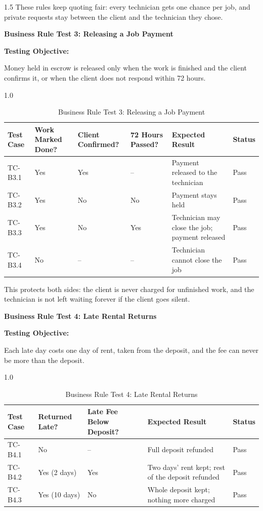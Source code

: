 \documentclass[A4paper,12pt]{report}
\theoremstyle{plain}
\theoremstyle{definition}
\theoremstyle{remark}
\numberwithin{equation}{section}
\begin{document}
\begin{spacing}{1.5}
These rules keep quoting fair: every technician gets one chance per job, and private requests stay between the client and the technician they chose.

\textbf{Business Rule Test 3: Releasing a Job Payment}

\textbf{Testing Objective:}

Money held in escrow is released only when the work is finished and the client confirms it, or when the client does not respond within 72 hours.

\begin{table}[H]
\centering
\caption{Business Rule Test 3: Releasing a Job Payment}
\begin{spacing}{1.0}
{\small
\begin{tabular}{|p{}|p{}|p{}|p{}|p{}|p{}|}
\hline
\textbf{Test Case} & \textbf{Work Marked Done?} & \textbf{Client Confirmed?} & \textbf{72 Hours Passed?} & \textbf{Expected Result} & \textbf{Status} \\ \hline
TC-B3.1 & Yes & Yes & -- & Payment released to the technician & Pass \\ \hline
TC-B3.2 & Yes & No & No & Payment stays held & Pass \\ \hline
TC-B3.3 & Yes & No & Yes & Technician may close the job; payment released & Pass \\ \hline
TC-B3.4 & No & -- & -- & Technician cannot close the job & Pass \\ \hline
\end{tabular}}
\end{spacing}
\end{table}

This protects both sides: the client is never charged for unfinished work, and the technician is not left waiting forever if the client goes silent.

\textbf{Business Rule Test 4: Late Rental Returns}

\textbf{Testing Objective:}

Each late day costs one day of rent, taken from the deposit, and the fee can never be more than the deposit.

\begin{table}[H]
\centering
\caption{Business Rule Test 4: Late Rental Returns}
\begin{spacing}{1.0}
{\small
\begin{tabular}{|p{}|p{}|p{}|p{}|p{}|}
\hline
\textbf{Test Case} & \textbf{Returned Late?} & \textbf{Late Fee Below Deposit?} & \textbf{Expected Result} & \textbf{Status} \\ \hline
TC-B4.1 & No & -- & Full deposit refunded & Pass \\ \hline
TC-B4.2 & Yes (2 days) & Yes & Two days' rent kept; rest of the deposit refunded & Pass \\ \hline
TC-B4.3 & Yes (10 days) & No & Whole deposit kept; nothing more charged & Pass \\ \hline
\end{tabular}}
\end{spacing}
\end{table}


\end{spacing}
\end{document}
